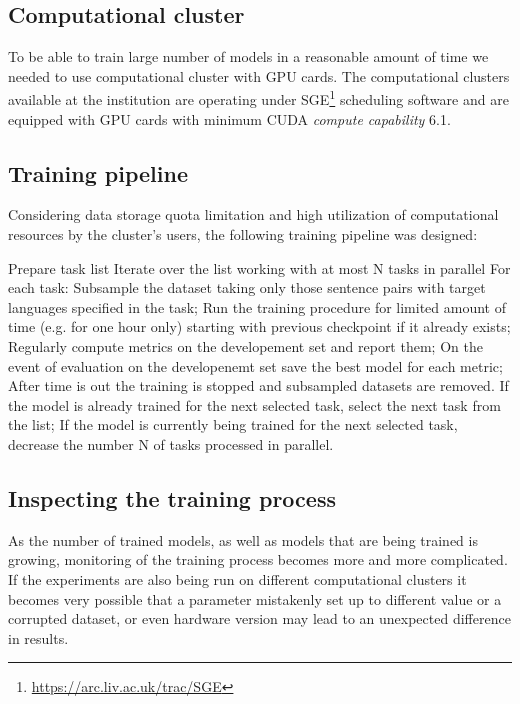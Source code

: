 \subsection{Computational cluster}

To be able to train large number of models in a reasonable amount of time we needed to use
computational cluster with GPU cards.
The computational clusters available at the institution are operating under
SGE\footnote{\url{https://arc.liv.ac.uk/trac/SGE}} scheduling software and are equipped with
GPU cards with minimum CUDA \textit{compute capability} 6.1.


\subsection{Training pipeline}
\label{section:training_pipeline}

Considering data storage quota limitation and high utilization of computational resources by
the cluster's users, the following training pipeline was designed:

\begin{outline}
    \1 Prepare task list
    \1 Iterate over the list working with at most N tasks in parallel
    \1 For each task:
        \2 Subsample the dataset taking only those sentence pairs with target languages
	   specified in the task;
	\2 Run the training procedure for limited amount of time (e.g. for one hour only)
	   starting with previous checkpoint if it already exists;
	\2 Regularly compute metrics on the developement set and report them;
	\2 On the event of evaluation on the developenemt set save the best model for each metric;
	\2 After time is out the training is stopped and subsampled datasets are removed.
    \1 If the model is already trained for the next selected task,  select the next task from the list;
    \1 If the model is currently being trained for the next selected task, decrease
       the number N of tasks processed in parallel.
\end{outline}


\subsection{Inspecting the training process}

As the number of trained models, as well as models that are being trained is growing, monitoring of the training
process becomes more and more complicated. If the experiments are also being run on different
computational clusters it becomes very possible that a parameter mistakenly set up to different
value or a corrupted dataset, or even hardware version may lead to an unexpected difference in results.

